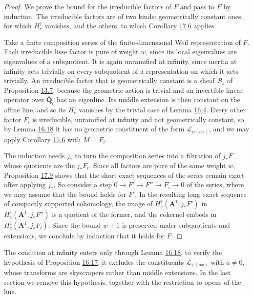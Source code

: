 \documentclass[11pt]{article}
\begin{document}
\begin{proof}[{Proof}]\label{bp253}%
We prove the bound for the irreducible factors of \(F\) and pass to \(F\) by induction. The irreducible factors are of two kinds: geometrically constant ones, for which \(H^1_c\) vanishes, and the others, to which Corollary \hyperref[bp241]{17.6} applies.

Take a finite composition series of the finite-dimensional Weil representation of \(F\). Each irreducible lisse factor is pure of weight \(w\), since its local eigenvalues are eigenvalues of a subquotient. It is again unramified at infinity, since inertia at infinity acts trivially on every subquotient of a representation on which it acts trivially. An irreducible factor that is geometrically constant is a sheaf \(\mathcal B_b\) of Proposition \hyperref[bp24]{13.7}, because the geometric action is trivial and an invertible linear operator over \(\overline{\mathbf Q}_\ell\) has an eigenline. Its middle extension is then constant on the affine line, and so its \(H_c^1\) vanishes by the trivial case of Lemma \hyperref[bp179]{16.4}. Every other factor \(F_i\) is irreducible, unramified at infinity and not geometrically constant, so by Lemma \hyperref[bp221]{16.18} it has no geometric constituent of the form \(\mathcal L_{\psi(ax)}\), and we may apply Corollary \hyperref[bp241]{17.6} with \(M=F_i\).

The induction needs \(j_*\) to turn the composition series into a filtration of \(j_*F\) whose quotients are the \(j_*F_i\). Since all factors are pure of the same weight \(w\), Proposition \hyperref[bp249]{17.9} shows that the short exact sequences of the series remain exact after applying \(j_*\). So consider a step \(0\to F'\to F''\to F_i\to0\) of the series, where we may assume that the bound holds for \(F'\). In the resulting long exact sequence of compactly supported cohomology, the image of \(H^1_c(\mathbf A^1,j_*F')\) in \(H^1_c(\mathbf A^1,j_*F'')\) is a quotient of the former, and the cokernel embeds in \(H^1_c(\mathbf A^1,j_*F_i)\). Since the bound \(w+1\) is preserved under subquotients and extensions, we conclude by induction that it holds for \(F\).
\end{proof}

\label{bp254}%
The condition at infinity enters only through Lemma \hyperref[bp221]{16.18}, to verify the hypothesis of Proposition \hyperref[bp218]{16.17}: it excludes the constituents \(\mathcal L_{\psi(ax)}\) with \(a\ne0\), whose transforms are skyscrapers rather than middle extensions. In the last section we remove this hypothesis, together with the restriction to opens of the line.
\end{document}
